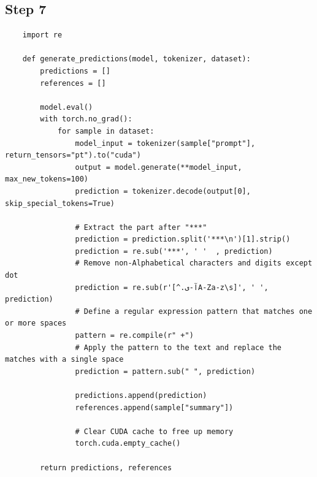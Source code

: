 \documentclass{solutionclass} %
\begin{document}
\subsection*{Step 7}


\begin{lstlisting}
	import re
	
	def generate_predictions(model, tokenizer, dataset):
		predictions = []
		references = []
	
		model.eval()
		with torch.no_grad():
			for sample in dataset:
				model_input = tokenizer(sample["prompt"], return_tensors="pt").to("cuda")
				output = model.generate(**model_input, max_new_tokens=100)
				prediction = tokenizer.decode(output[0], skip_special_tokens=True)
				
				# Extract the part after "***"
				prediction = prediction.split('***\n')[1].strip()
				prediction = re.sub('***', ' '  , prediction)
				# Remove non-Alphabetical characters and digits except dot
				prediction = re.sub(r'[^.آ-یA-Za-z\s]', ' ', prediction)
				# Define a regular expression pattern that matches one or more spaces
				pattern = re.compile(r" +")
				# Apply the pattern to the text and replace the matches with a single space
				prediction = pattern.sub(" ", prediction)
				
				predictions.append(prediction)
				references.append(sample["summary"])
				
				# Clear CUDA cache to free up memory
				torch.cuda.empty_cache()
	
		return predictions, references
	\end{lstlisting}
\end{document}
